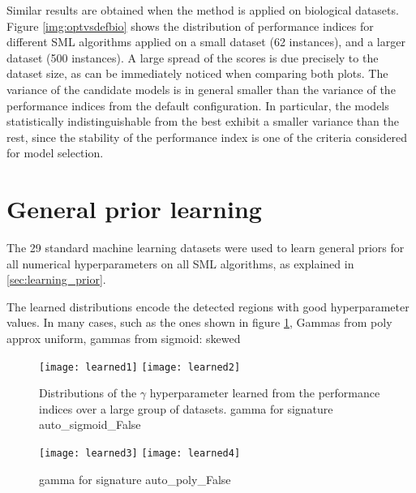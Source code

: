 Similar results are obtained when the method is applied on biological datasets. Figure
\ref{img:optvsdefbio} shows the distribution of performance indices for different SML algorithms
applied on a small dataset (62 instances), and a larger dataset (500 instances). A large spread of
the scores is due precisely to the dataset size, as can be immediately noticed when comparing
both plots. The variance of the candidate models is in general
smaller than the variance of the performance indices from the default configuration. In particular,
the models statistically indistinguishable from the best exhibit a smaller variance than the rest,
since the stability of the performance index is one of the criteria considered for model selection.

\section{General prior learning}

The 29 standard machine learning datasets were used to learn general priors for all numerical
hyperparameters on all SML algorithms, as explained in \ref{sec:learning_prior}. 

The learned distributions encode the detected regions with good hyperparameter values. In many
cases, such as the ones shown in figure \ref{fig:learned_gamma1}, 
Gammas from poly approx uniform, gammas from sigmoid: skewed


\begin{figure}[h!]
	\centering
	\texttt{[image: learned1]}
	\texttt{[image: learned2]}
	\caption{Distributions of the $\gamma$ hyperparameter learned from the performance indices over
	a large group of datasets. gamma for signature auto\_sigmoid\_False} \label{img:learned1}
	\label{fig:learned_gamma1}
\end{figure}


\begin{figure}[h!]
	\centering
	\texttt{[image: learned3]}
	\texttt{[image: learned4]}
	\caption{gamma for signature auto\_poly\_False}
	\label{img:learned4}
\end{figure}

